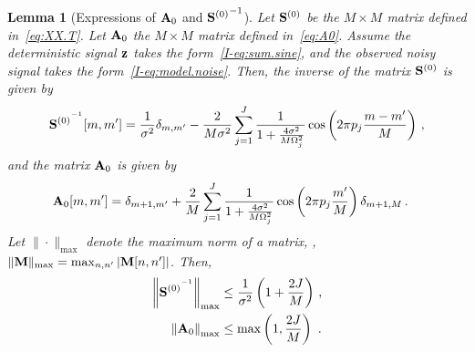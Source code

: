 \documentclass[journal,onecolumn]{IEEEtran}
\newtheorem{lemma}{Lemma}
\begin{document}
\begin{lemma}[Expressions of ${\mathbf A}_0$ and ${{\mathbf S}^{(0)}}^{-1}$]
Let ${\mathbf S}^{(0)}$ be the $M\times M$ matrix defined in~\eqref{eq:XX.T}. Let ${\mathbf A}_0$ the $M\times M$ matrix defined in~\eqref{eq:A0}. Assume the deterministic signal ${\mathbf z}$ takes the form~\eqref{I-eq:sum.sine}, and the observed noisy signal takes the form~\eqref{I-eq:model.noise}. Then, the inverse of the matrix ${\mathbf S}^{(0)}$ is given by
\begin{equation}
{\bS^{(0)}}^\inv[m,m']  = \dfrac1{\sigma^2}\delta_{m,m'}-\dfrac{2}{M\sigma^2}\sum_{j=1}^J\dfrac{1}{1+\frac{4\sigma^2}{M\Omega_j^2}}\cos\left(2\pi p_j \dfrac{m-m'}{M}\right)\,,
\label{eq:S0.inv}
\end{equation}
and the matrix ${\mathbf A}_0$ is given by
\begin{align}
\bA_0[m,m']  &= \delta_{m+1,m'} + \dfrac2M\sum_{j=1}^J\dfrac{1}{1+\frac{4\sigma^2}{M\Omega_j^2}}\cos\left(2\pi p_j\frac{m'}{M}\right)\delta_{m+1,M}\,.
\label{eq:A0.sine}
\end{align}
Let $\|\cdot\|_{\max}$ denote the maximum norm of a matrix, \ie, $\|{\mathbf M}\|_{\max} = \max_{n,n'} \left|{\mathbf M}[n,n']\right|$. Then,
\begin{align}
\label{eq:S0.inv.bound}
\left\|{\bS^{(0)}}^\inv\right\|_{\max} &\leq \dfrac1{\sigma^2}\left(1+\frac{2J}{M}\right)\,, \\
\left\|\bA_0\right\|_{\max} &\leq \max\left(1,\frac{2J}{M}\right)\ .
\label{eq:A0.bound}
\end{align}
\end{lemma}
\end{document}
